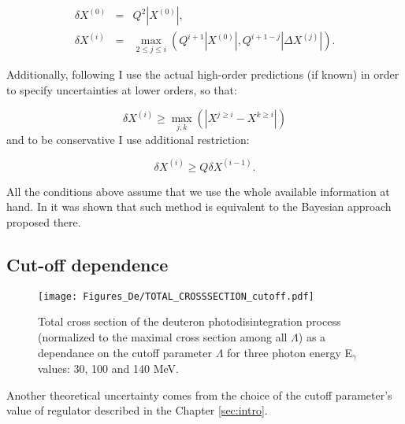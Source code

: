     \begin{eqnarray}
        \delta X^{(0)} &=& Q^2 \left| X^{(0)} \right| \label{trunc2},\\ 
        \delta X^{(i)} &=& \max_{2 \leq j \leq i} \left( Q^{i+1} \left| X^{(0)} \right|,
        Q^{i+1-j} \left| \Delta X^{(j)} \right| \right). \label{trunc3} 
    \end{eqnarray}

    Additionally, following \cite{Binder2015} I use the actual high-order predictions 
    (if known) in order to specify uncertainties at lower orders, so that:

    \begin{equation}
        \delta X^{(i)} \geq \max_{j,k} (|X^{j \geq i} - X^{k \geq i}|)
        \label{trunc4}
    \end{equation}
    and to be conservative I use additional restriction:

    \begin{equation}
        \delta X^{(i)} \geq Q \delta X^{(i-1)}.
        \label{trunc5}
    \end{equation}

    All the conditions above assume that we use the whole available information at hand.
    In \cite{Melendez_BayesTrunc} it was shown that such method is equivalent
    to the Bayesian approach proposed there.


    \subsection*{Cut-off dependence}



    \begin{figure}[htb]
        \begin{center}
            \texttt{[image: Figures\_De/TOTAL\_CROSSSECTION\_cutoff.pdf]}
        \end{center}
        \caption{Total cross section of the deuteron photodisintegration
        process (normalized to the maximal cross section among all $\Lambda$)
        as a dependance on the cutoff parameter $\Lambda$ 
        for three photon energy E$_\gamma$ values: 30, 100 and 140 MeV.}
        \label{Cutoff_dep}
        \end{figure}

    Another theoretical uncertainty comes from the choice of the cutoff parameter's value 
    of regulator described in the Chapter \ref{sec:intro}.

